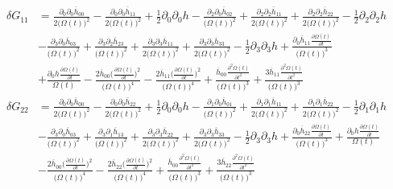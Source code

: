 \documentclass[10pt,letterpaper]{article}
\begin{document}
\begin{align}
	\delta  G_{11} &= \frac{\partial_{0}\partial_{0}\overline{h}_{00}}{2 \bigl(\Omega(t)\bigr)^2} -  \frac{\partial_{0}\partial_{0}\overline{h}_{11}}{2 \bigl(\Omega(t)\bigr)^2} + \tfrac{1}{2} \partial_{0}\partial_{0}h -  \frac{\partial_{2}\partial_{0}\overline{h}_{02}}{\bigl(\Omega(t)\bigr)^2} + \frac{\partial_{2}\partial_{2}\overline{h}_{11}}{2 \bigl(\Omega(t)\bigr)^2} + \frac{\partial_{2}\partial_{2}\overline{h}_{22}}{2 \bigl(\Omega(t)\bigr)^2} -  \tfrac{1}{2} \partial_{2}\partial_{2}h\\
& -  \frac{\partial_{3}\partial_{0}\overline{h}_{03}}{\bigl(\Omega(t)\bigr)^2} + \frac{\partial_{3}\partial_{2}\overline{h}_{23}}{\bigl(\Omega(t)\bigr)^2} + \frac{\partial_{3}\partial_{3}\overline{h}_{11}}{2 \bigl(\Omega(t)\bigr)^2} + \frac{\partial_{3}\partial_{3}\overline{h}_{33}}{2 \bigl(\Omega(t)\bigr)^2} -  \tfrac{1}{2} \partial_{3}\partial_{3}h + \frac{\partial_{0}\overline{h}_{11} \frac{\partial \Omega(t)}{\partial t}}{\bigl(\Omega(t)\bigr)^3} \\
&+ \frac{\partial_{0}h \frac{\partial \Omega(t)}{\partial t}}{\Omega(t)} -  \frac{2 \overline{h}_{00} \bigl(\frac{\partial \Omega(t)}{\partial t}\bigr)^2}{\bigl(\Omega(t)\bigr)^4} -  \frac{2 \overline{h}_{11} \bigl(\frac{\partial \Omega(t)}{\partial t}\bigr)^2}{\bigl(\Omega(t)\bigr)^4} + \frac{\overline{h}_{00} \frac{\partial^{2}\Omega(t)}{\partial t^{2}}}{\bigl(\Omega(t)\bigr)^3} + \frac{3 \overline{h}_{11} \frac{\partial^{2}\Omega(t)}{\partial t^{2}}}{\bigl(\Omega(t)\bigr)^3}
\end{align}
\begin{align}
	\delta G_{22} &=\frac{\partial_{0}\partial_{0}\overline{h}_{00}}{2 \bigl(\Omega(t)\bigr)^2} -  \frac{\partial_{0}\partial_{0}\overline{h}_{22}}{2 \bigl(\Omega(t)\bigr)^2} + \tfrac{1}{2} \partial_{0}\partial_{0}h -  \frac{\partial_{1}\partial_{0}\overline{h}_{01}}{\bigl(\Omega(t)\bigr)^2} + \frac{\partial_{1}\partial_{1}\overline{h}_{11}}{2 \bigl(\Omega(t)\bigr)^2} + \frac{\partial_{1}\partial_{1}\overline{h}_{22}}{2 \bigl(\Omega(t)\bigr)^2} -  \tfrac{1}{2} \partial_{1}\partial_{1}h\\
&-  \frac{\partial_{3}\partial_{0}\overline{h}_{03}}{\bigl(\Omega(t)\bigr)^2} + \frac{\partial_{3}\partial_{1}\overline{h}_{13}}{\bigl(\Omega(t)\bigr)^2} + \frac{\partial_{3}\partial_{3}\overline{h}_{22}}{2 \bigl(\Omega(t)\bigr)^2} + \frac{\partial_{3}\partial_{3}\overline{h}_{33}}{2 \bigl(\Omega(t)\bigr)^2} -  \tfrac{1}{2} \partial_{3}\partial_{3}h + \frac{\partial_{0}\overline{h}_{22} \frac{\partial \Omega(t)}{\partial t}}{\bigl(\Omega(t)\bigr)^3} + \frac{\partial_{0}h \frac{\partial \Omega(t)}{\partial t}}{\Omega(t)} \\
&-  \frac{2 \overline{h}_{00} \bigl(\frac{\partial \Omega(t)}{\partial t}\bigr)^2}{\bigl(\Omega(t)\bigr)^4} -  \frac{2 \overline{h}_{22} \bigl(\frac{\partial \Omega(t)}{\partial t}\bigr)^2}{\bigl(\Omega(t)\bigr)^4} + \frac{\overline{h}_{00} \frac{\partial^{2}\Omega(t)}{\partial t^{2}}}{\bigl(\Omega(t)\bigr)^3} + \frac{3 \overline{h}_{22} \frac{\partial^{2}\Omega(t)}{\partial t^{2}}}{\bigl(\Omega(t)\bigr)^3}
\end{align}
\end{document}
